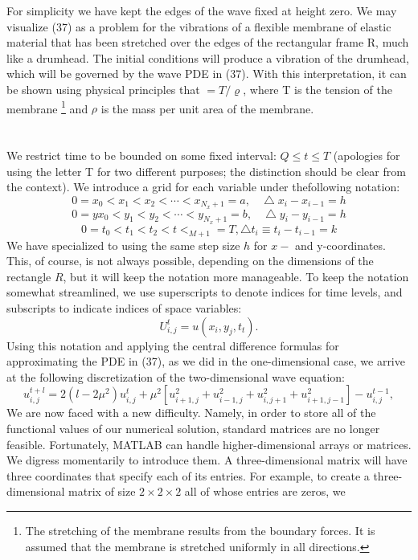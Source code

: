\documentclass[../main.tex]{subfiles}
\begin{document}
For simplicity we have kept the edges of the wave fixed at height zero. We may visualize (37) as a problem for the vibrations of a flexible membrane of elastic material that has been stretched over the edges of the rectangular frame R, much like a drumhead. The initial conditions will produce a vibration of the drumhead, which will be governed by the wave PDE in (37). With this interpretation, it can be shown using physical principles that $ = T/ \varrho$, where T is the tension of the membrane 
\footnote{ The stretching of the membrane results from the boundary forces. It is assumed that the membrane is 
stretched uniformly in all directions.}
and $\rho$ is the mass per unit area of the membrane. 
\\
\\
\\
We restrict time to be bounded on some fixed interval: $Q \leqslant t \leqslant T$ (apologies for using the letter T for two different purposes; the distinction should be clear from the context). We introduce a grid for each variable under thefollowing notation: 
$$0 = x_0 < x_1 < x_2< \cdots <x_{N_x +1}=a, ~~~~\bigtriangleup x_i-x_{i-1}=h$$
\begin{equation}
	0 =yx_0 < y_1 < y_2< \cdots <y_{N_x +1}=b, ~~~~\bigtriangleup y_i-y_{i-1}=h
\end{equation}
$$0= t_0 < t_1 < t_2 <t<_{M+1}=T, \bigtriangleup t_i \equiv t_i-t_{i-1}=k$$
We have specialized to using the same step size $h$ for $x-$ and y-coordinates. This, of course, is not always possible, depending on the dimensions of the rectangle $R$, but it will keep the notation more manageable. To keep the notation somewhat streamlined, we use superscripts to denote indices for time levels, and subscripts to indicate indices of space variables: 
$$U_{i,j}^t=u(x_i,y_j,t_t).$$
Using this notation and applying the central difference formulas for approximating the PDE in (37), as we did in the one-dimensional case, we arrive at the following discretization of the two-dimensional wave equation:
\begin{equation}
	u_{i,j}^{t+l}=2(l-2 \mu^2)u_{i,j}^t+\mu^2[u_{i+1,j}^2+u_{i-1,j}^2+u_{i,j+1}^2+u_{i+1,j-1}^2]-u_{i,j}^{t-1},
\end{equation}
We are now faced with a new difficulty. Namely, in order to store all of the functional values of our numerical solution, standard matrices are no longer feasible. Fortunately, MATLAB can handle higher-dimensional arrays or matrices. We digress momentarily to introduce them. A three-dimensional matrix will have three coordinates that specify each of its entries. For example, to create a three-dimensional matrix of size $2\times 2 \times 2$ all of whose entries are zeros, we 
\end{document}
